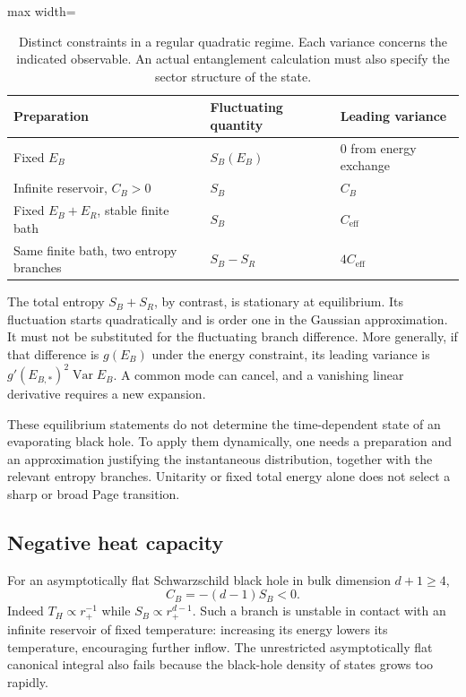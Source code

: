 \documentclass[11pt,letterpaper]{article}
\theoremstyle{plain}
\theoremstyle{definition}
\theoremstyle{remark}
\begin{document}
\begin{table}[t]
 \centering
 \caption{Distinct constraints in a regular quadratic regime.
 Each variance concerns the indicated observable. An actual entanglement
 calculation must also specify the sector structure of the state.}
 \label{tab09:micro_vs_canonical}
 \begin{adjustbox}{max width=\textwidth}
 \begin{tabular}{lll}
 \toprule
 Preparation & Fluctuating quantity & Leading variance\\
 \midrule
 Fixed $E_B$ & $S_B(E_B)$ & $0$ from energy exchange\\
 Infinite reservoir, $C_B>0$ & $S_B$ & $C_B$\\
 Fixed $E_B+E_R$, stable finite bath & $S_B$ & $C_{\mathrm{eff}}$\\
 Same finite bath, two entropy branches & $S_B-S_R$ & $4C_{\mathrm{eff}}$\\
 \bottomrule
 \end{tabular}
 \end{adjustbox}
\end{table}

The total entropy $S_B+S_R$, by contrast, is stationary at equilibrium.
Its fluctuation starts quadratically and is order one in the Gaussian
approximation. It must not be substituted for the fluctuating branch
difference. More generally, if that difference is $g(E_B)$ under the energy
constraint, its leading variance is $g'(E_{B,*})^2\operatorname{Var}E_B$.
A common mode can cancel, and a vanishing linear derivative requires a new
expansion.

These equilibrium statements do not determine the time-dependent state of
an evaporating black hole. To apply them dynamically, one needs a preparation
and an approximation justifying the instantaneous distribution, together
with the relevant entropy branches. Unitarity or fixed total energy alone
does not select a sharp or broad Page transition.

\subsection{Negative heat capacity}
\label{subsec09:negative_cv}

For an asymptotically flat Schwarzschild black hole in bulk dimension
$d+1\geq4$,
\begin{equation}
 C_B=-(d-1)S_B<0.
 \label{eq09:cv_flat}
\end{equation}
Indeed $T_H\propto r_+^{-1}$ while $S_B\propto r_+^{d-1}$.
Such a branch is unstable in contact with an infinite reservoir of fixed
temperature: increasing its energy lowers its temperature, encouraging
further inflow. The unrestricted asymptotically flat canonical integral also
fails because the black-hole density of states grows too rapidly.
\end{document}
